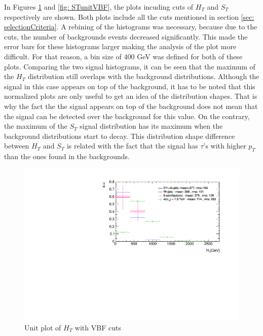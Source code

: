 In Figures \ref{fig: HTunitVBF} and \ref{fig: STunitVBF}, the plots incuding cuts of $H_{T}$ and $S_{T}$ respectively are shown. Both plots include all the cuts mentioned in section \ref{sec: selectionCriteria}. A rebining of the histograms was necessary, because due to the cuts, the number of backgrounds events decreased significantly. This made the error bars for these histograms larger making the analysis of the plot more difficult. For that reason, a bin size of 400 GeV was defined for both of these plots. Comparing the two signal histograms, it can be seen that the maximum of the $H_{T}$ distribution still overlaps with the background distributions. Although the signal in this case appears on top of the background, it has to be noted that this normalized plots are only useful to get an idea of the distribution shapes. That is why the fact the the signal appears on top of the background does not mean that the signal can be detected over the background for this value. On the contrary, the maximum of the $S_{T}$ signal distribution has its maximum when the background distributions start to decay. This distribution shape  difference between $H_{T}$ and $S_{T}$ is related with the fact that the signal has $\tau$'s with higher $p_{T}$ than the ones found in the backgrounds.

\begin{figure}
\begin{center}
 \includegraphics[width=\linewidth]{Plots/HT_unitVBF.pdf}
\end{center}
\caption{Unit plot of $H_{T}$ with VBF cuts}
\label{fig: HTunitVBF}
\end{figure}

